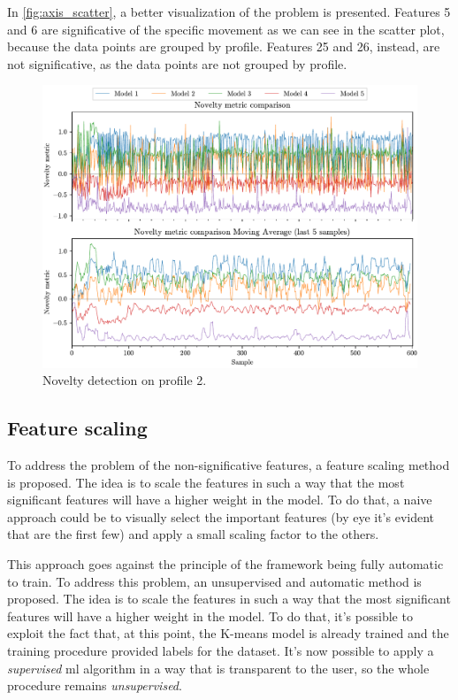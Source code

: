 In \autoref{fig:axis_scatter}, a better visualization of the problem is presented. Features 5 and 6 are significative of the specific movement as we can see in the scatter plot, because the data points are grouped by profile. Features 25 and 26, instead, are not significative, as the data points are not grouped by profile.



\begin{figure}
    \centering
    \includegraphics[angle=-90,origin=c]{images/LinearMotor/Testing.pdf}
    \caption{Novelty detection on profile 2.}
    \label{fig:axis_testing}
\end{figure}
\clearpage


\subsection{Feature scaling}
To address the problem of the non-significative features, a feature scaling method is proposed. The idea is to scale the features in such a way that the most significant features will have a higher weight in the model. To do that, a naive approach could be to visually select the important features (by eye it's evident that are the first few) and apply a small scaling factor to the others. 

This approach goes against the principle of the framework being fully automatic to train. To address this problem, an unsupervised and automatic method is proposed. The idea is to scale the features in such a way that the most significant features will have a higher weight in the model. To do that, it's possible to exploit the fact that, at this point, the K-means model is already trained and the training procedure provided labels for the dataset. It's now possible to apply a \emph{supervised} \gls{ml} algorithm in a way that is transparent to the user, so the whole procedure remains \emph{unsupervised}.

